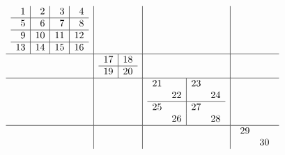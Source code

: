 \documentclass[11pt,a4paper]{amsart}
\begin{document}
\begin{align*}
  \begin{array}{c|c|c|c}
    \begin{array}{r|r|r|r}
      1&2&3&4\\\hline
      5&6&7&8\\\hline
      9&10&11&12\\\hline
      13&14&15&16\\
    \end{array}
       &&& \\\hline
    &
         \begin{array}{r|r}
           17&18\\\hline
           19&20\\
         \end{array}
         && \\\hline
       &&
          \begin{array}{rr|rr}
            21&&23&\\
            &22&&24\\\hline
            25&&27&\\
            &26&&28\\
          \end{array}
         & \\\hline
       &&&
           \begin{array}{rr}
             29&\\
             &30\\
           \end{array}
    \\
  \end{array}
\end{align*}
\end{document}
